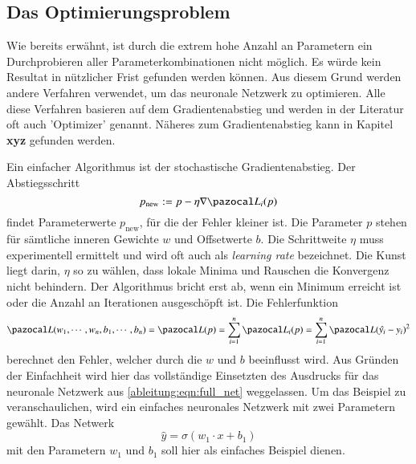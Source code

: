 \subsection{Das Optimierungsproblem}
Wie bereits erwähnt, ist durch die extrem hohe Anzahl an Parametern ein Durchprobieren aller Parameterkombinationen nicht möglich.
Es würde kein Resultat in nützlicher Frist gefunden werden können.
Aus diesem Grund werden andere Verfahren verwendet, um das neuronale Netzwerk zu optimieren.
Alle diese Verfahren basieren auf dem Gradientenabstieg und werden in der Literatur oft auch 'Optimizer' genannt. Näheres zum Gradientenabstieg kann in Kapitel \textbf{xyz} gefunden werden.

Ein einfacher Algorithmus ist der stochastische Gradientenabstieg.
Der Abstiegsschritt 
\begin{equation}
p_{\text{new}}:=p-\eta \nabla \Lb_{i}(p)
\end{equation}
findet Parameterwerte $p_{\text{new}}$, für die der Fehler kleiner ist. Die Parameter $p$ stehen für sämtliche inneren Gewichte $w$ und Offsetwerte $b$. Die Schrittweite $\eta$ muss experimentell ermittelt und wird oft auch als \textit{learning rate} bezeichnet. Die Kunst liegt darin, $\eta$ so zu wählen, dass lokale Minima und Rauschen die Konvergenz nicht behindern. Der Algorithmus bricht erst ab, wenn ein Minimum erreicht ist oder die Anzahl an Iterationen ausgeschöpft ist.
Die Fehlerfunktion
\begin{equation}
\Lb(w_1, \cdots, w_n, b_1, \cdots, b_n) = \Lb(p)=\sum_{i=1}^{n}\Lb_{i}(p)=\sum_{i=1}^{n}\Lb(\hat{y_i}-y_i)^2
\end{equation}
berechnet den Fehler, welcher durch die $w$ und $b$ beeinflusst wird. Aus Gründen der Einfachheit wird hier das vollständige Einsetzten des Ausdrucks für das neuronale Netzwerk aus \eqref{ableitung:eqn:full_net} weggelassen.
Um das Beispiel zu veranschaulichen, wird ein einfaches neuronales Netzwerk mit zwei Parametern  gewählt. Das Netwerk
\begin{equation}
	\hat{y} = \sigma \left( w_1 \cdot x + b_1 \right)
\end{equation}
mit den Parametern $w_1$ und $b_1$ soll hier als einfaches Beispiel dienen.

